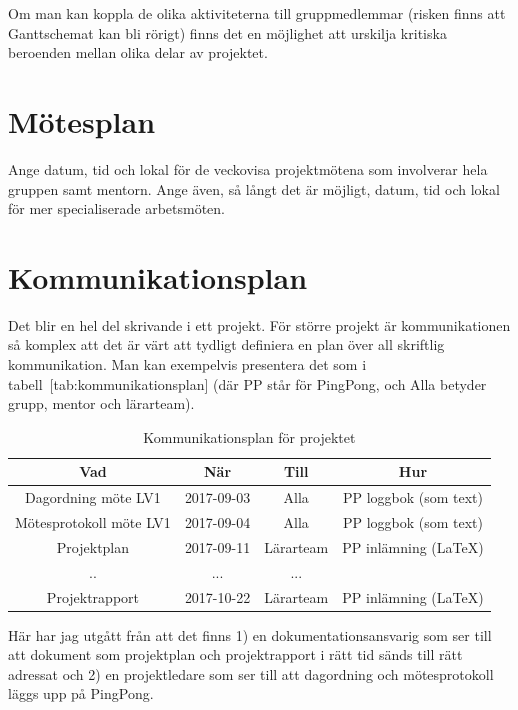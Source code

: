 \documentclass[a4paper]{article}
\begin{document}
Om man kan koppla de olika aktiviteterna till gruppmedlemmar (risken
finns att Ganttschemat kan bli rörigt) finns det en möjlighet att
urskilja kritiska beroenden mellan olika delar av projektet.



\section {Mötesplan}


Ange datum, tid och lokal för de veckovisa projektmötena som involverar
hela gruppen samt mentorn. Ange även, så långt det är möjligt, datum,
tid och lokal för mer specialiserade arbetsmöten.



\section {Kommunikationsplan}


Det blir en hel del skrivande i ett projekt. För större projekt är
kommunikationen så komplex att det är värt att tydligt definiera en plan
över all skriftlig kommunikation. Man kan exempelvis presentera det som
i tabell [tab:kommunikationsplan] (där PP står för PingPong, och Alla
betyder grupp, mentor och lärarteam).

\begin{table}
\begin{center}
\begin{tabular}{ |c|c|c|c| } 
 \hline
 Vad & När & Till & Hur \\ 
 \hline
 \hline
 Dagordning möte LV1 & 2017-09-03 & Alla & PP loggbok (som text)\\ 
 \hline
 Mötesprotokoll möte LV1 & 2017-09-04 & Alla & PP loggbok (som text) \\ 
 \hline
 Projektplan & 2017-09-11 & Lärarteam & PP inlämning (LaTeX) \\ 
 \hline
 .. & ... & ... \\
 \hline
 Projektrapport & 2017-10-22 & Lärarteam & PP inlämning (LaTeX) \\
 \hline
\end{tabular}
\end{center}
\caption {Kommunikationsplan för projektet}
\end{table}

Här har jag utgått från att det finns 1) en dokumentationsansvarig som
ser till att dokument som projektplan och projektrapport i rätt tid
sänds till rätt adressat och 2) en projektledare som ser till att
dagordning och mötesprotokoll läggs upp på PingPong.
\end{document}
